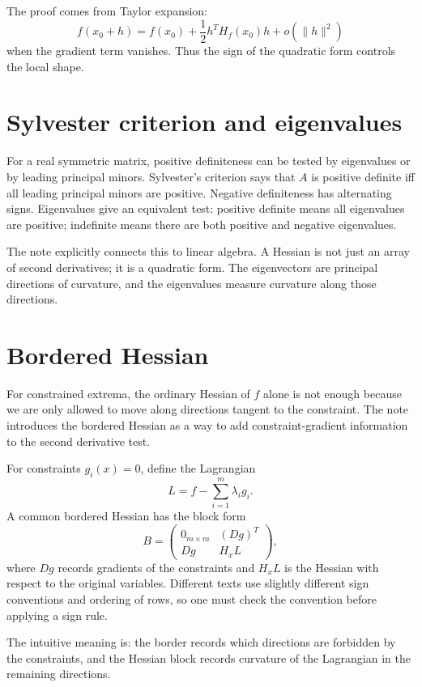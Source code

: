 The proof comes from Taylor expansion:
\[
  f(x_0+h)=f(x_0)+\frac12 h^T H_f(x_0)h+o(\|h\|^2)
\]
when the gradient term vanishes.  Thus the sign of the quadratic form controls the local shape.

\section{Sylvester criterion and eigenvalues}

For a real symmetric matrix, positive definiteness can be tested by eigenvalues or by leading principal minors.  Sylvester's criterion says that $A$ is positive definite iff all leading principal minors are positive.  Negative definiteness has alternating signs.  Eigenvalues give an equivalent test: positive definite means all eigenvalues are positive; indefinite means there are both positive and negative eigenvalues.

The note explicitly connects this to linear algebra.  A Hessian is not just an array of second derivatives; it is a quadratic form.  The eigenvectors are principal directions of curvature, and the eigenvalues measure curvature along those directions.

\section{Bordered Hessian}

For constrained extrema, the ordinary Hessian of $f$ alone is not enough because we are only allowed to move along directions tangent to the constraint.  The note introduces the bordered Hessian as a way to add constraint-gradient information to the second derivative test.

For constraints $g_i(x)=0$, define the Lagrangian
\[
  L=f-\sum_{i=1}^m \lambda_i g_i.
\]
A common bordered Hessian has the block form
\[
  B=
  \begin{pmatrix}
  0_{m\times m} & (Dg)^T\\
  Dg & H_x L
  \end{pmatrix},
\]
where $Dg$ records gradients of the constraints and $H_xL$ is the Hessian with respect to the original variables.  Different texts use slightly different sign conventions and ordering of rows, so one must check the convention before applying a sign rule.

The intuitive meaning is: the border records which directions are forbidden by the constraints, and the Hessian block records curvature of the Lagrangian in the remaining directions.

